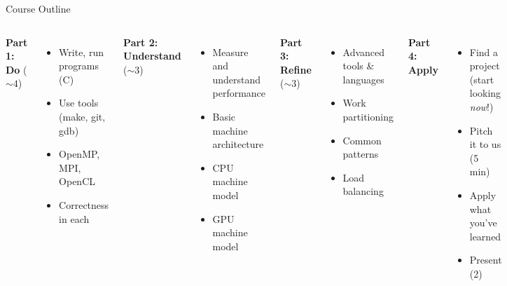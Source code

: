\documentclass[english,compress]{beamer}
\begin{document}
\begin{frame}{Course Outline}
  \begin{columns}
    \textbf{Part 1: Do} ($\sim 4$)

    \begin{itemize}
      \item Write, run programs (C)
      \item Use tools (make, git, gdb)
      \item OpenMP, MPI, OpenCL
      \item Correctness in each
    \end{itemize}

    \medskip
    \textbf{Part 2: Understand} ($\sim$3)

    \begin{itemize}
      \item Measure and understand performance
      \item Basic machine architecture
      \item CPU machine model
      \item GPU machine model
    \end{itemize}

    \textbf{Part 3: Refine} ($\sim$3)

    \begin{itemize}
      \item Advanced tools \& languages
      \item Work partitioning
      \item Common patterns
      \item Load balancing
    \end{itemize}

    \medskip
    \textbf{Part 4: Apply}

    \begin{itemize}
      \item Find a project\\
        (start looking \emph{now}!)
      \item Pitch it to us (5 min)
      \item Apply what you've learned
      \item Present (2)
    \end{itemize}
  \end{columns}
\end{frame}
\end{document}
